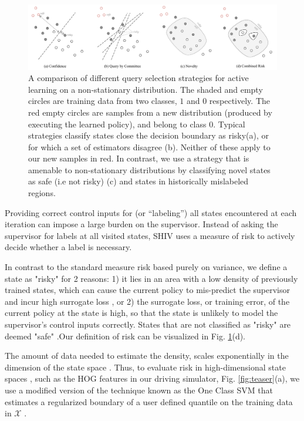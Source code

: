 \documentclass[10pt, conference]{ieeeconf}      %
\newcommand{\fpnote}[1]{\ifthenelse{ \boolean{include-notes}}%
 {\textcolor{blue}{\textbf{FP: #1}}}{}}
\begin{document}
\begin{figure}[t]
\centering

\includegraphics[width=\textwidth]{figures/active_learning.pdf}

\caption{A comparison of different query selection strategies for active learning on a non-stationary distribution. The shaded and empty circles are training data from two classes, $1$ and $0$ respectively. The red empty circles are samples from a new distribution (produced by executing the learned policy), and belong to class $0$. Typical strategies classify states close the decision boundary as risky(a), or for which a set of estimators disagree (b). Neither of these apply to our new samples in red. In contrast, we use a strategy that is amenable to non-stationary distributions by classifying  novel states as safe (i.e not risky) (c) and states in historically mislabeled regions. }
\label{fig:support_example}
\end{figure}



Providing correct control inputs for (or ``labeling'')  all states encountered at each
iteration can impose a large burden on the supervisor.
Instead of asking the supervisor for labels at all visited states, SHIV uses a measure of risk to actively decide whether a label is necessary. 

In contrast to the standard measure risk based purely on variance, we define a state as "risky" for 2 reasons: 1) it lies in an area with a low density of
previously trained states, which can cause the current policy to mis-predict the supervisor and incur high surrogate
loss \cite{tokdar2010importance}, or 2) the surrogate loss, or training error, of the current policy at the state  is high, so that the state is unlikely to model the supervisor's control inputs correctly. States that are not classified as "risky" are deemed "safe" .Our definition of risk can be visualized in Fig. \ref{fig:support_example}(d).  

The amount of data needed to estimate the density, scales exponentially in the dimension of the state space \cite{nadaraya1964estimating}. 
Thus, to evaluate risk in high-dimensional state spaces , such as the HOG features in our driving simulator, Fig. \ref{fig:teaser}(a), we use
a modified version of the technique known as the One Class SVM that  estimates a regularized boundary of a user defined quantile on the training data in $\mathcal{X}$ \cite{scholkopf2001estimating}.
\end{document}
